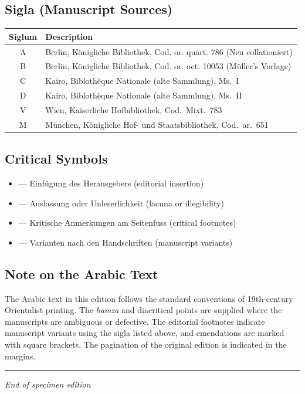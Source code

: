\documentclass[11pt,a4paper]{article}
\begin{document}
\subsection{Sigla (Manuscript Sources)}

\begin{longtable}{cl}
\toprule
\textbf{Siglum} & \textbf{Description} \\
\midrule
\endhead
\bottomrule
\endfoot
A & Berlin, Königliche Bibliothek, Cod. or. quart. 786 (Neu collationiert) \\
B & Berlin, Königliche Bibliothek, Cod. or. oct. 10053 (Müller's Vorlage) \\
C & Kairo, Biblothèque Nationale (alte Sammlung), Ms.~I \\
D & Kairo, Biblothèque Nationale (alte Sammlung), Ms.~II \\
V & Wien, Kaiserliche Hofbibliothek, Cod.~Mixt.~783 \\
M & München, Königliche Hof- und Staatsbibliothek, Cod.~ar.~651 \\
\bottomrule
\end{longtable}

\subsection{Critical Symbols}

\begin{itemize}[leftmargin=2em]
  \item [\textbf{[ ]}] --- Einfügung des Herausgebers (editorial insertion)
  \item [\textbf{$\langle$ $\rangle$}] --- Auslassung oder Unleserlichkeit (lacuna or illegibility)
  \item [\textbf{a), b), c)}] --- Kritische Anmerkungen am Seitenfuss (critical footnotes)
  \item [\textbf{BC}, \textbf{A}, etc.] --- Varianten nach den Handschriften (manuscript variants)
\end{itemize}

\subsection{Note on the Arabic Text}

The Arabic text in this edition follows the standard conventions of 19th-century Orientalist printing. The \textit{hamza} and diacritical points are supplied where the manuscripts are ambiguous or defective. The editorial footnotes indicate manuscript variants using the sigla listed above, and emendations are marked with square brackets. The pagination of the original edition is indicated in the margins.

\vspace{1cm}
\noindent\rule{\textwidth}{0.4pt}

\begin{center}
\textit{End of specimen edition}
\end{center}
\end{document}
